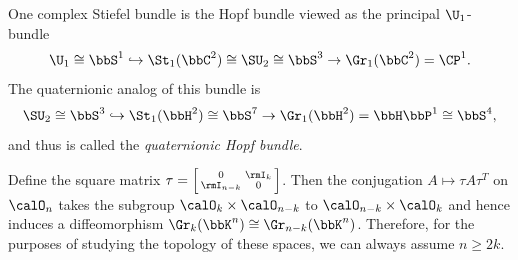 \begin{example}\label{ex Hopf principal bundle}
    One complex Stiefel bundle is the Hopf bundle viewed as the principal $\U_1$-bundle
    \[\U_1\cong\bbS^1\hookrightarrow \St_1(\bbC^2)\cong \SU_2\cong\bbS^3\to \Gr_1(\bbC^2)=\CP^1.\]
    The quaternionic analog of this bundle is 
    \[\SU_2\cong \bbS^3\hookrightarrow \St_1(\bbH^2)\cong \bbS^7\to \Gr_1(\bbH^2)=\bbH\bbP^1\cong \bbS^4,\]
    and thus is called the \emph{quaternionic Hopf bundle}.
\end{example}

\begin{rem}
   Define the square matrix $\tau=\left[\begin{smallmatrix}
       0&\rmI_k\\\rmI_{n-k}&0
   \end{smallmatrix}\right]$. 
   Then the conjugation $A\mapsto \tau A\tau^T$ on $\calO_n$ takes the subgroup $\calO_k\times\calO_{n-k}$ to $\calO_{n-k}\times\calO_{k}$ and hence induces a diffeomorphism $\Gr_k(\bbK^n)\cong \Gr_{n-k}(\bbK^n)$. Therefore, for the purposes of studying the topology of these spaces, we can always assume $n\geq 2k$.
\end{rem}


